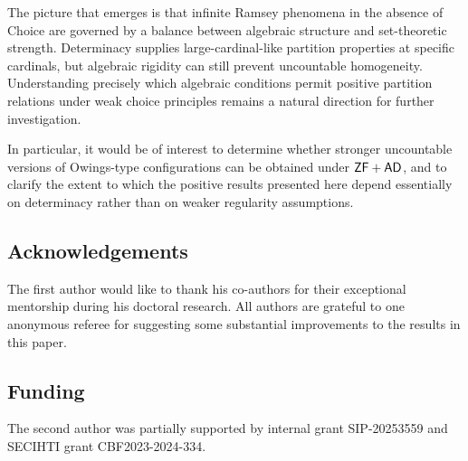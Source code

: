 \documentclass{amsart}
\theoremstyle{definition}
\newcommand{\zf}{\mathnormal{\mathsf{ZF}}}
\newcommand{\ad}{\mathnormal{\mathsf{AD}}}
\theoremstyle{remark}
\numberwithin{equation}{section}
\begin{document}
The picture that emerges is that infinite Ramsey phenomena in the absence of Choice are governed by a balance between algebraic structure and set-theoretic strength. 
Determinacy supplies large-cardinal-like partition properties at specific cardinals, but algebraic rigidity can still prevent uncountable homogeneity. 
Understanding precisely which algebraic conditions permit positive partition relations under weak choice principles remains a natural direction for further investigation.

In particular, it would be of interest to determine whether stronger uncountable versions of Owings-type configurations can be obtained under $\zf+\ad$, and to clarify the extent to which the positive results presented here depend essentially on determinacy rather than on weaker regularity assumptions.

\subsection*{Acknowledgements}
The first author would like to thank his co-authors for their exceptional mentorship during his doctoral research. All authors are grateful to one anonymous referee for suggesting some substantial improvements to the results in this paper.

\subsection* {Funding}
The second author was partially supported by internal grant SIP-20253559 and SECIHTI grant CBF2023-2024-334.



\end{document}
